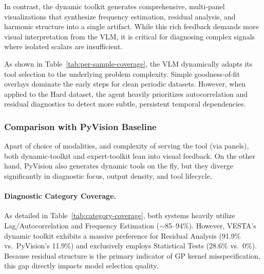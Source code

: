 \documentclass{article}
\begin{document}
In contrast, the dynamic toolkit generates comprehensive, multi-panel visualizations that synthesize frequency estimation, residual analysis, and harmonic structure into a single artifact. While this rich feedback demands more visual interpretation from the VLM, it is critical for diagnosing complex signals where isolated scalars are insufficient. 

As shown in Table~\ref{tab:per-sample-coverage}, the VLM dynamically adapts its tool selection to the underlying problem complexity. Simple goodness-of-fit overlays dominate the early steps for clean periodic datasets. However, when applied to the Hard dataset, the agent heavily prioritizes autocorrelation and residual diagnostics to detect more subtle, persistent temporal dependencies.

\subsubsection{Comparison with PyVision Baseline}
Apart of choice of modalities, and complexity of serving the tool (via panels), both dynamic-toolkit and expert-toolkit lean into visual feedback. On the other hand, PyVision also generates dynamic tools on the fly, but they diverge significantly in diagnostic focus, output density, and tool lifecycle.

\paragraph{Diagnostic Category Coverage.} 
As detailed in Table~\ref{tab:category-coverage}, both systems heavily utilize Lag/Autocorrelation and Frequency Estimation (${\sim}$85--94\%). However, VESTA's dynamic toolkit exhibits a massive preference for Residual Analysis (91.9\% vs.\ PyVision's 11.9\%) and exclusively employs Statistical Tests (28.6\% vs.\ 0\%). Because residual structure is the primary indicator of GP kernel misspecification, this gap directly impacts model selection quality.
\end{document}
